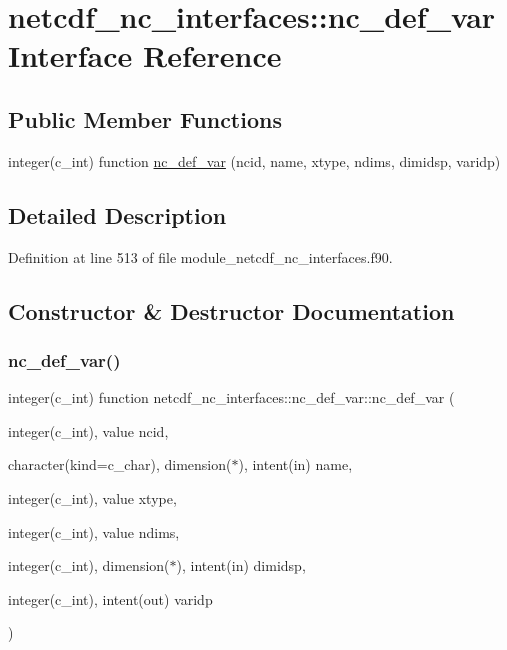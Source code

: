 \hypertarget{interfacenetcdf__nc__interfaces_1_1nc__def__var}{}\section{netcdf\+\_\+nc\+\_\+interfaces\+:\+:nc\+\_\+def\+\_\+var Interface Reference}
\label{interfacenetcdf__nc__interfaces_1_1nc__def__var}
\subsection*{Public Member Functions}
\begin{DoxyCompactItemize}
\item 
integer(c\+\_\+int) function \hyperlink{interfacenetcdf__nc__interfaces_1_1nc__def__var_ac8c109a340e3bec32998062a50c34faa}{nc\+\_\+def\+\_\+var} (ncid, name, xtype, ndims, dimidsp, varidp)
\end{DoxyCompactItemize}


\subsection{Detailed Description}


Definition at line 513 of file module\+\_\+netcdf\+\_\+nc\+\_\+interfaces.\+f90.



\subsection{Constructor \& Destructor Documentation}
\mbox{\label{interfacenetcdf__nc__interfaces_1_1nc__def__var_ac8c109a340e3bec32998062a50c34faa}} 
\subsubsection{\texorpdfstring{nc\+\_\+def\+\_\+var()}{nc\_def\_var()}}
{\footnotesize\ttfamily integer(c\+\_\+int) function netcdf\+\_\+nc\+\_\+interfaces\+::nc\+\_\+def\+\_\+var\+::nc\+\_\+def\+\_\+var (\begin{DoxyParamCaption}\item[{integer(c\+\_\+int), value}]{ncid,  }\item[{character(kind=c\+\_\+char), dimension($\ast$), intent(in)}]{name,  }\item[{integer(c\+\_\+int), value}]{xtype,  }\item[{integer(c\+\_\+int), value}]{ndims,  }\item[{integer(c\+\_\+int), dimension($\ast$), intent(in)}]{dimidsp,  }\item[{integer(c\+\_\+int), intent(out)}]{varidp }\end{DoxyParamCaption})}



